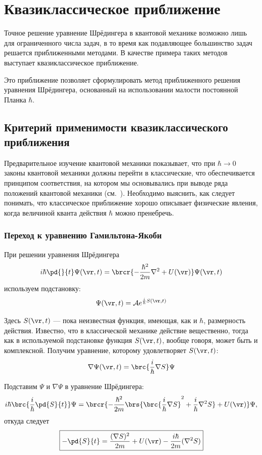 \chapter{Квазиклассическое приближение}

Точное решение уравнение Шрёдингера в квантовой механике возможно лишь для ограниченного числа задач, в то время как подавляющее большинство задач решается приближенными методами. В качестве примера таких методов выступает квазиклассическое приближение.

Это приближение позволяет сформулировать метод приближенного решения уравнения Шрёдингера, основанный на использовании малости постоянной Планка $\hbar$.
 
\section{Критерий применимости квазиклассического приближения}

Предварительное изучение квантовой механики показывает, что при $\hbar \to 0$ законы квантовой механики должны перейти в классические, что обеспечивается принципом соответствия, на котором мы основывались при выводе ряда положений квантовой механики (см.~). Необходимо выяснить, как следует понимать, что классическое приближение хорошо описывает физические явления, когда величиной кванта действия $\hbar$ можно пренебречь.

\subsection{Переход к уравнению Гамильтона-Якоби}

При решении уравнения Шрёдингера
$$
i\hbar \pd{}{t} \Psi(\vr, t) = \brcr{-\frac{\hbar^2}{2m} \nabla^2 + U(\vr)} \Psi(\vr,t)
$$
используем подстановку:
$$
\Psi(\vr, t) = \mathcal{A} e^{\frac{i}{\hbar}S(\vr,t)}
$$

Здесь $S(\vr, t)$ --- пока неизвестная функция, имеющая, как и $\hbar$, размерность действия. Известно, что в классической механике действие вещественно, тогда как в используемой подстановке функция $S(\vr, t)$, вообще говоря, может быть и комплексной. Получим уравнение, которому удовлетворяет $S(\vr, t)$:   
$$
\nabla \Psi(\vr,t) = \brc{\frac{i}{\hbar}\nabla S}\Psi
$$

Подставим $\Psi$ и $\nabla \Psi$ в уравнение Шрёдингера:
$$
i\hbar\brc{\frac{i}{\hbar}\pd{S}{t}}\Psi = 
\brcr{ -\frac{\hbar^2}{2m} \brs{ \brc{\frac{i}{\hbar}\nabla S}^2 + \frac{i}{\hbar}{\nabla^2} S} + U(\vr) } \Psi,
$$
откуда следует
\begin{equation}
\label{eq:11_1_1}
\boxed{-\pd{S}{t} = \frac{(\nabla S)^2}{2m} + U(\vr) - \frac{i\hbar}{2m} (\nabla^2 S)}
\end{equation}

